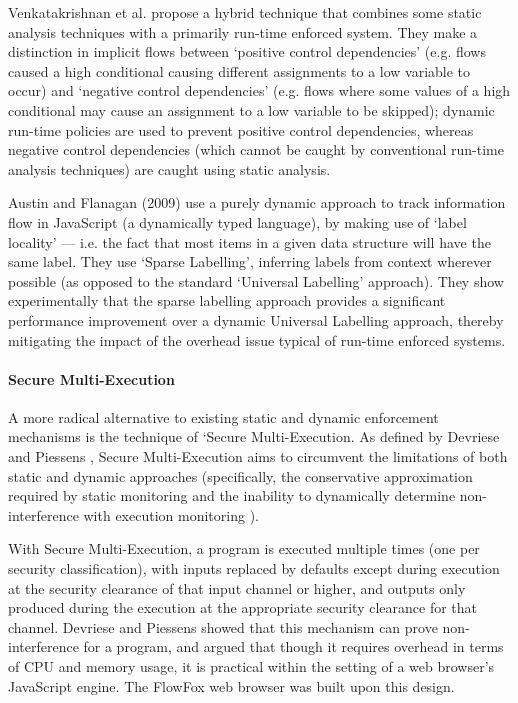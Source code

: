 Venkatakrishnan et al. \cite{venkatakrishnan2006runtime} propose a hybrid technique that combines some static analysis techniques with a primarily run-time enforced system. They make a distinction in implicit flows between `positive control dependencies' (e.g. flows caused a high conditional causing different assignments to a low variable to occur) and `negative control dependencies' (e.g. flows where some values of a high conditional may cause an assignment to a low variable to be skipped); dynamic run-time policies are used to prevent positive control dependencies, whereas negative control dependencies (which cannot be caught by conventional run-time analysis techniques) are caught using static analysis.

Austin and Flanagan (2009) \cite{austin2009dynamicif} use a purely dynamic approach to track information flow in JavaScript (a dynamically typed language), by making use of `label locality' --- i.e. the fact that most items in a given data structure will have the same label. They use `Sparse Labelling', inferring labels from context wherever possible (as opposed to the standard `Universal Labelling' approach). They show experimentally that the sparse labelling approach provides a significant performance improvement over a dynamic Universal Labelling approach, thereby mitigating the impact of the overhead issue typical of run-time enforced systems.

\paragraph{Secure Multi-Execution}

A more radical alternative to existing static and dynamic enforcement mechanisms is the technique of `Secure Multi-Execution. As defined by Devriese and Piessens \cite{devriese2010sme}, Secure Multi-Execution aims to circumvent the limitations of both static and dynamic approaches (specifically, the conservative approximation required by static monitoring and the inability to dynamically determine non-interference with execution monitoring \cite{schneider2000executionmonitoring}).

With Secure Multi-Execution, a program is executed multiple times (one per security classification), with inputs replaced by defaults except during execution at the security clearance of that input channel or higher, and outputs only produced during the execution at the appropriate security clearance for that channel. Devriese and Piessens \cite{devriese2010sme} showed that this mechanism can prove non-interference for a program, and argued that though it requires overhead in terms of CPU and memory usage, it is practical within the setting of a web browser's JavaScript engine. The FlowFox web browser \cite{degroef2012flowfox} was built upon this design.
	